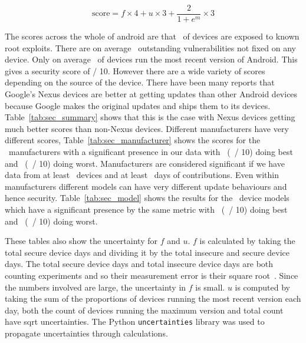 \begin{equation}
\mathrm{score} = f\times 4 + u \times 3 + \frac{2}{1+e^m} \times 3 \label{eq:score}
\end{equation}

The scores across the whole of android are that \daMeanInsecurityPerc\ of devices are exposed to known root exploits.
There are on average \daMeanOutstandingVulnerabilities\ outstanding vulnerabilities not fixed on any device.
Only on average \daUpdatednessPerc\ of devices run the most recent version of Android.
This gives a security score of \daSecurityScore / 10.
\daTabSecScoressummary
However there are a wide variety of scores depending on the source of the device.
There have been many reports that Google's Nexus devices are better at getting updates than other Android devices because Google makes the original updates and ships them to its devices.
Table~\ref{tab:sec_summary} shows that this is the case with Nexus devices getting much better scores than non-Nexus devices.
\daTabSecScoresmanufacturer
Different manufacturers have very different scores, Table~\ref{tab:sec_manufacturer} shows the scores for the \daNumSigManufacturers\ manufacturers with a significant presence in our data with \daSecScoreBestmanufacturer\ (\daSecScoreBestmanufacturerScore\ / 10) doing best and \daSecScoreWorstmanufacturer\ (\daSecScoreWorstmanufacturerScore\ / 10) doing worst.
Manufacturers are considered significant if we have data from at least \daSigNumDevices\ devices and at least \daSigNumDeviceDays\ days of contributions.
\daTabSecScoresmodel
Even within manufacturers different models can have very different update behaviours and hence security.
Table~\ref{tab:sec_model} shows the results for the \daNumSigModels\ device models which have a significant presence by the same metric with \daSecScoreBestmodel\ (\daSecScoreBestmodelScore\ / 10) doing best and \daSecScoreWorstmodel\ (\daSecScoreWorstmodelScore\ / 10) doing worst.


These tables also show the uncertainty for $f$ and $u$.
$f$ is calculated by taking the total secure device days and dividing it by the total insecure and secure device days.
The total secure device days and total insecure device days are both counting experiments and so their measurement error is their square root~\cite{Taylor1997}.
Since the numbers involved are large, the uncertainty in $f$ is small.
$u$ is computed by taking the sum of the proportions of devices running the most recent version each day, both the count of devices running the maximum version and total count have sqrt uncertainties.
The Python \texttt{uncertainties} library was used to propagate uncertainties through calculations.

